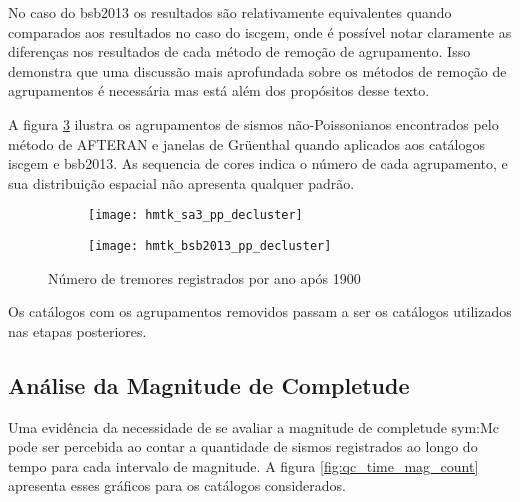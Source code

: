 No caso do \gls{bsb2013} os resultados são relativamente equivalentes quando comparados aos resultados no caso do 
\glsdesc{iscgem}, onde é possível notar claramente as diferenças nos resultados de cada método de remoção de
agrupamento. Isso demonstra que uma discussão mais aprofundada sobre os métodos de 
remoção de agrupamentos é necessária mas está além dos propósitos desse texto.

A figura \ref{fig:eq_decluster} ilustra os agrupamentos de sismos não-Poissonianos encontrados 
pelo método de AFTERAN \citep{musson_2000} e janelas de Gr\"uenthal quando aplicados
aos catálogos \gls{iscgem} e \gls{bsb2013}. As sequencia de cores indica o número de cada agrupamento, e sua
distribuição espacial não apresenta qualquer padrão. 

\begin{figure}[H]
	\centering
	\begin{subfigure}[t]{0.46\textwidth}
		  	\centering
			\texttt{[image: hmtk\_sa3\_pp\_decluster]}
			\label{fig:sa_decluster}
	\end{subfigure}%
	\quad %
	\begin{subfigure}[t]{0.50\textwidth}
		  	\centering
			\texttt{[image: hmtk\_bsb2013\_pp\_decluster]}
			\label{fig:br_decluster}
    \end{subfigure}%
	\caption{Número de tremores registrados por ano após 1900}
	\label{fig:eq_decluster}
\end{figure}

Os catálogos com os agrupamentos removidos passam a ser os catálogos utilizados nas etapas posteriores.

\subsection{Análise da Magnitude de Completude}
\label{sec:completeness}

Uma evidência da necessidade de se avaliar a magnitude de completude \gls{sym:Mc}
pode ser percebida ao contar a quantidade de sismos registrados ao longo do tempo
para cada intervalo de magnitude. A figura \ref{fig:qc_time_mag_count} apresenta
esses gráficos para os catálogos considerados.

